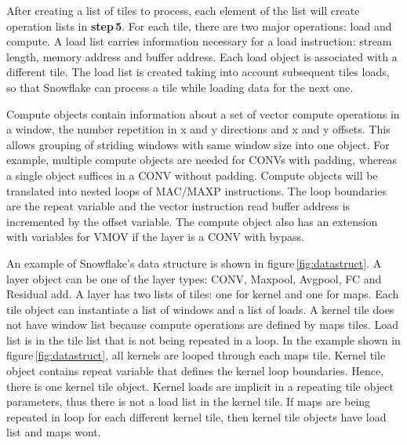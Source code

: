 \documentclass{sig-alternate}
\begin{document}

After creating a list of tiles to process, each element of the list will create operation lists in \textbf{step\,5}. For each tile, there are two major operations: load and compute. A load list carries information necessary for a load instruction: stream length, memory address and buffer address. Each load object is associated with a different tile. The load list is created taking into account subsequent tiles loads, so that Snowflake can process a tile while loading data for the next one. 

Compute objects contain information about a set of vector compute operations in a window, the number repetition in x and y directions and x and y offsets. This allows grouping of striding windows with same window size into one object. For example, multiple compute objects are needed for CONVs with padding, whereas a single object suffices in a CONV without padding. Compute objects will be translated into nested loops of MAC/MAXP instructions. The loop boundaries are the repeat variable and the vector instruction read buffer address is incremented by the offset variable. The compute object also has an extension with variables for VMOV if the layer is a CONV with bypass.

An example of Snowflake's data structure is shown in figure\,\ref{fig:datastruct}. A layer object can be one of the layer types: CONV, Maxpool, Avgpool, FC and Residual add. A layer has two lists of tiles: one for kernel and one for maps. Each tile object can instantiate a list of windows and a list of loads. A kernel tile does not have window list because compute operations are defined by maps tiles. Load list is in the tile list that is not being repeated in a loop. In the example shown in figure\,\ref{fig:datastruct}, all kernels are looped through each maps tile. Kernel tile object contains repeat variable that defines the kernel loop boundaries. Hence, there is one kernel tile object. Kernel loads are implicit in a repeating tile object parameters, thus there is not a load list in the kernel tile. If maps are being repeated in loop for each different kernel tile, then kernel tile objects have load list and maps wont.

\end{document}
